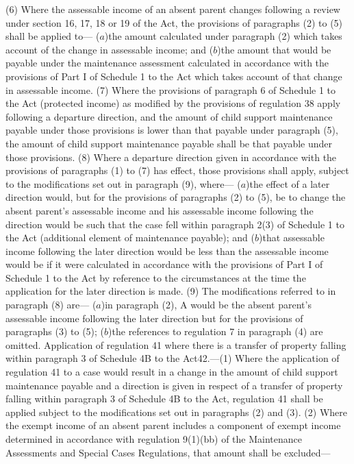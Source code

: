 \documentclass[a4paper]{article}
\begin{document}
(6) Where the assessable income of an absent parent changes following a review
under section 16, 17, 18 or 19 of the Act, the provisions of paragraphs (2) to
(5) shall be applied to—
($a$)the amount calculated under paragraph (2) which takes account of the change
in assessable income; and
($b$)the amount that would be payable under the maintenance assessment calculated
in accordance with the provisions of Part I of Schedule 1 to the Act which takes
account of that change in assessable income.
(7) Where the provisions of paragraph 6 of Schedule 1 to the Act (protected
income) as modified by the provisions of regulation 38 apply following a
departure direction, and the amount of child support maintenance payable under
those provisions is lower than that payable under paragraph (5), the amount of
child support maintenance payable shall be that payable under those provisions.
(8) Where a departure direction given in accordance with the provisions of
paragraphs (1) to (7) has effect, those provisions shall apply, subject to the
modifications set out in paragraph (9), where—
($a$)the effect of a later direction would, but for the provisions of paragraphs
(2) to (5), be to change the absent parent’s assessable income and his
assessable income following the direction would be such that the case fell
within paragraph 2(3) of Schedule 1 to the Act (additional element of
maintenance payable); and
($b$)that assessable income following the later direction would be less than the
assessable income would be if it were calculated in accordance with the
provisions of Part I of Schedule 1 to the Act by reference to the circumstances
at the time the application for the later direction is made.
(9) The modifications referred to in paragraph (8) are—
($a$)in paragraph (2), A would be the absent parent’s assessable income following
the later direction but for the provisions of paragraphs (3) to (5);
($b$)the references to regulation 7 in paragraph (4) are omitted.
Application of regulation 41 where there is a transfer of property falling
within paragraph 3 of Schedule 4B to the Act42.—(1) Where the application of
regulation 41 to a case would result in a change in the amount of child support
maintenance payable and a direction is given in respect of a transfer of
property falling within paragraph 3 of Schedule 4B to the Act, regulation 41
shall be applied subject to the modifications set out in paragraphs (2) and (3).
(2) Where the exempt income of an absent parent includes a component of exempt
income determined in accordance with regulation 9(1)(bb) of the Maintenance
Assessments and Special Cases Regulations, that amount shall be excluded—
\end{document}

